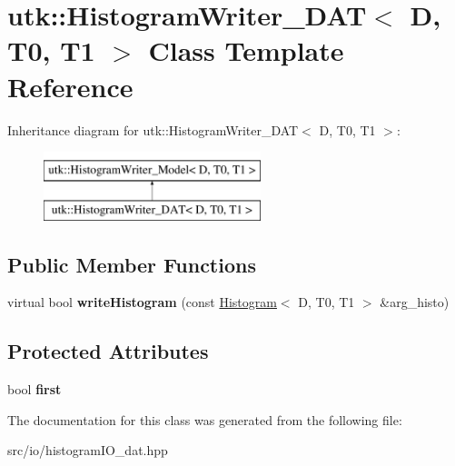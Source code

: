 \hypertarget{classutk_1_1HistogramWriter__DAT}{\section{utk\-:\-:Histogram\-Writer\-\_\-\-D\-A\-T$<$ D, T0, T1 $>$ Class Template Reference}
\label{classutk_1_1HistogramWriter__DAT}
}
Inheritance diagram for utk\-:\-:Histogram\-Writer\-\_\-\-D\-A\-T$<$ D, T0, T1 $>$\-:\begin{figure}[H]
\begin{center}
\leavevmode
\includegraphics[height=2.000000cm]{classutk_1_1HistogramWriter__DAT}
\end{center}
\end{figure}
\subsection*{Public Member Functions}
\begin{DoxyCompactItemize}
\item 
\hypertarget{classutk_1_1HistogramWriter__DAT_a238f993aadd7fab7ce118a459065f815}{virtual bool {\bfseries write\-Histogram} (const \hyperlink{classutk_1_1Histogram}{Histogram}$<$ D, T0, T1 $>$ \&arg\-\_\-histo)}\label{classutk_1_1HistogramWriter__DAT_a238f993aadd7fab7ce118a459065f815}

\end{DoxyCompactItemize}
\subsection*{Protected Attributes}
\begin{DoxyCompactItemize}
\item 
\hypertarget{classutk_1_1HistogramWriter__DAT_a19b2190cecf67a101623b0cae9e94f63}{bool {\bfseries first}}\label{classutk_1_1HistogramWriter__DAT_a19b2190cecf67a101623b0cae9e94f63}

\end{DoxyCompactItemize}


The documentation for this class was generated from the following file\-:\begin{DoxyCompactItemize}
\item 
src/io/histogram\-I\-O\-\_\-dat.\-hpp\end{DoxyCompactItemize}
